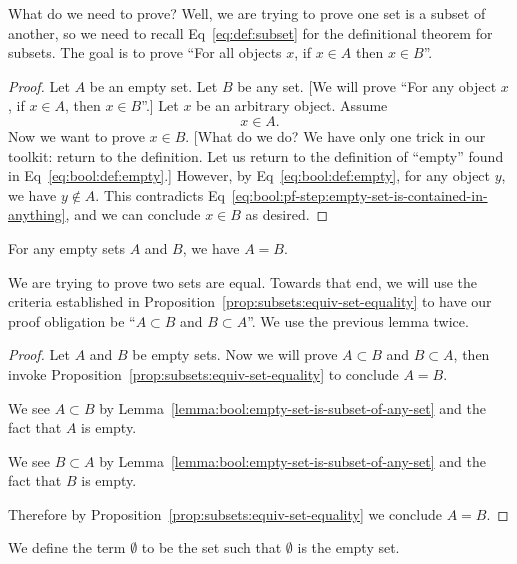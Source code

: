 What do we need to prove? Well, we are trying to prove one set is a
subset of another, so we need to recall Eq~\eqref{eq:def:subset} for the
definitional theorem for subsets. The goal is to prove ``For all objects
$x$, if $x\in A$ then $x\in B$''.

\begin{proof}
Let $A$ be an empty set.
Let $B$ be any set. [We will prove ``For any object $x$, if $x\in A$,
then $x\in B$''.] Let $x$ be an arbitrary object.
Assume
\begin{equation}\label{eq:bool:pf-step:empty-set-is-contained-in-anything}
x\in A.
\end{equation}
Now we want to prove $x\in B$. [What do we do?
We have only one trick in our toolkit: return to the definition. Let us
return to the definition of ``empty'' found in Eq~\eqref{eq:bool:def:empty}.]
However, by Eq~\eqref{eq:bool:def:empty}, for any object $y$, we have
$y\notin A$. This contradicts Eq~\eqref{eq:bool:pf-step:empty-set-is-contained-in-anything},
and we can conclude $x\in B$ as desired.
\end{proof}

\begin{theorem}\label{thm:bool:uniqueness-of-empty-set}
For any empty sets $A$ and $B$, we have $A=B$.
\end{theorem}

We are trying to prove two sets are equal. Towards that end, we will use
the criteria established in Proposition~\ref{prop:subsets:equiv-set-equality}
to have our proof obligation be ``$A\subset B$ and $B\subset A$''.
We use the previous lemma twice.

\begin{proof}
Let $A$ and $B$ be empty sets. Now we will prove $A\subset B$ and
$B\subset A$, then invoke Proposition~\ref{prop:subsets:equiv-set-equality}
to conclude $A=B$.

We see $A\subset B$ by Lemma~\ref{lemma:bool:empty-set-is-subset-of-any-set}
and the fact that $A$ is empty.

We see $B\subset A$ by Lemma~\ref{lemma:bool:empty-set-is-subset-of-any-set}
and the fact that $B$ is empty.

Therefore by Proposition~\ref{prop:subsets:equiv-set-equality}
we conclude $A=B$.
\end{proof}

\begin{definition}
We define the term $\emptyset$ to be the set such that $\emptyset$ is
the empty set.
\end{definition}

